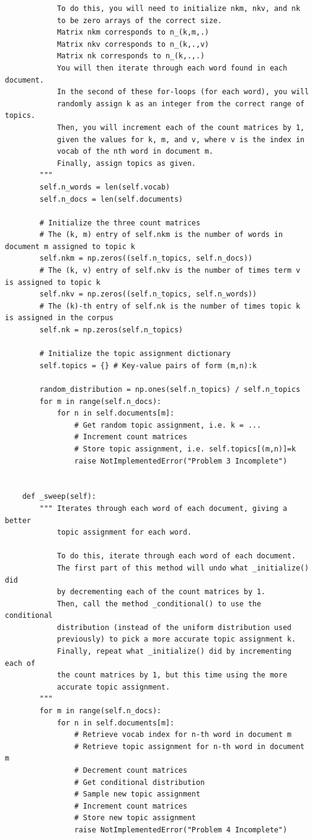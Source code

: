\begin{lstlisting}
            To do this, you will need to initialize nkm, nkv, and nk
            to be zero arrays of the correct size.
            Matrix nkm corresponds to n_(k,m,.)
            Matrix nkv corresponds to n_(k,.,v)
            Matrix nk corresponds to n_(k,.,.)
            You will then iterate through each word found in each document.
            In the second of these for-loops (for each word), you will
            randomly assign k as an integer from the correct range of topics.
            Then, you will increment each of the count matrices by 1,
            given the values for k, m, and v, where v is the index in
            vocab of the nth word in document m.
            Finally, assign topics as given.
        """
        self.n_words = len(self.vocab)
        self.n_docs = len(self.documents)

        # Initialize the three count matrices
        # The (k, m) entry of self.nkm is the number of words in document m assigned to topic k
        self.nkm = np.zeros((self.n_topics, self.n_docs))
        # The (k, v) entry of self.nkv is the number of times term v is assigned to topic k
        self.nkv = np.zeros((self.n_topics, self.n_words))
        # The (k)-th entry of self.nk is the number of times topic k is assigned in the corpus
        self.nk = np.zeros(self.n_topics)

        # Initialize the topic assignment dictionary
        self.topics = {} # Key-value pairs of form (m,n):k

        random_distribution = np.ones(self.n_topics) / self.n_topics
        for m in range(self.n_docs):
            for n in self.documents[m]:
                # Get random topic assignment, i.e. k = ...
                # Increment count matrices
                # Store topic assignment, i.e. self.topics[(m,n)]=k
                raise NotImplementedError("Problem 3 Incomplete")


    def _sweep(self):
        """ Iterates through each word of each document, giving a better
            topic assignment for each word.

            To do this, iterate through each word of each document.
            The first part of this method will undo what _initialize() did
            by decrementing each of the count matrices by 1.
            Then, call the method _conditional() to use the conditional
            distribution (instead of the uniform distribution used
            previously) to pick a more accurate topic assignment k.
            Finally, repeat what _initialize() did by incrementing each of
            the count matrices by 1, but this time using the more
            accurate topic assignment.
        """
        for m in range(self.n_docs):
            for n in self.documents[m]:
                # Retrieve vocab index for n-th word in document m
                # Retrieve topic assignment for n-th word in document m
                # Decrement count matrices
                # Get conditional distribution
                # Sample new topic assignment
                # Increment count matrices
                # Store new topic assignment
                raise NotImplementedError("Problem 4 Incomplete")



\end{lstlisting}
